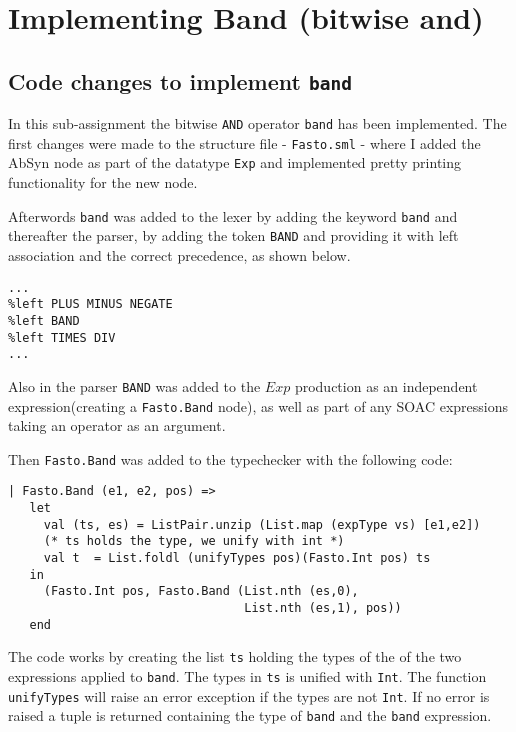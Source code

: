 \documentclass[11pt,a4paper]{article}
\begin{document}
\section{Implementing Band (bitwise and)}

\subsection{Code changes to implement \texttt{band}}

In this sub-assignment the bitwise \texttt{AND} operator \texttt{band} has
been implemented. The first changes were made to the structure file -
\texttt{Fasto.sml} - where I added the AbSyn node as part of the datatype
\texttt{Exp} and implemented pretty printing functionality for the new node.

Afterwords \texttt{band} was added to the lexer by adding the keyword
\texttt{band} and thereafter the parser, by adding the token \texttt{BAND} and
providing it with left association and the correct precedence, as shown below.
\begin{lstlisting}
...
%left PLUS MINUS NEGATE
%left BAND
%left TIMES DIV
...
\end{lstlisting}
Also in the parser \texttt{BAND} was added to the $Exp$ production as an
independent expression(creating a \texttt{Fasto.Band} node), as well as part
of any SOAC expressions taking an operator as an argument.

Then \texttt{Fasto.Band} was added to the typechecker with the following code:
\begin{lstlisting}
| Fasto.Band (e1, e2, pos) =>
   let
     val (ts, es) = ListPair.unzip (List.map (expType vs) [e1,e2])
     (* ts holds the type, we unify with int *)
     val t  = List.foldl (unifyTypes pos)(Fasto.Int pos) ts
   in
     (Fasto.Int pos, Fasto.Band (List.nth (es,0),
                                 List.nth (es,1), pos))
   end
\end{lstlisting}
The code works by creating the list \texttt{ts} holding the
types of the of the two expressions applied to \texttt{band}. The types in
\texttt{ts} is unified with \texttt{Int}. The function \texttt{unifyTypes}
will raise an error exception if the types are not \texttt{Int}. If no error
is raised a tuple is returned containing the type of \texttt{band} and the
\texttt{band} expression.
\end{document}
